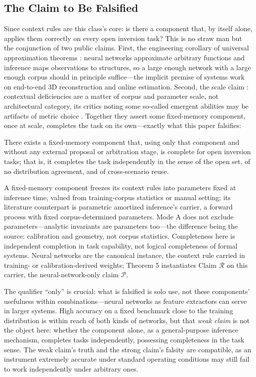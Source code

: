 \subsection{The Claim to Be Falsified}

Since context rules are this class's core: is there a component that, by itself alone, applies them correctly on every open inversion task? This is no straw man but the conjunction of two public claims. First, the engineering corollary of universal approximation theorems \citep{cybenko1989,hornik1989}: neural networks approximate arbitrary functions and inference maps observations to structures, so a large enough network with a large enough corpus should in principle suffice---the implicit premise of systems work on end-to-end 3D reconstruction and online estimation. Second, the scale claim \citep{bubeck2023}: contextual deficiencies are a matter of corpus and parameter scale, not architectural category, its critics noting some so-called emergent abilities may be artifacts of metric choice \citep{schaeffer2023}. Together they assert some fixed-memory component, once at scale, completes the task on its own---exactly what this paper falsifies:

\begin{claim}[$\mathcal{R}$]
There exists a fixed-memory component that, using only that component and without any external proposal or arbitration stage, is complete for open inversion tasks; that is, it completes the task independently in the sense of the open set, of no distribution agreement, and of cross-scenario reuse.
\end{claim}

A fixed-memory component freezes its context rules into parameters fixed at inference time, valued from training-corpus statistics or manual setting; its literature counterpart is parametric amortized inference's carrier, a forward process with fixed corpus-determined parameters. Mode A does not exclude parameters---analytic invariants are parameters too---the difference being the source: calibration and geometry, not corpus statistics. Completeness here is independent completion in task capability, not logical completeness of formal systems. Neural networks are the canonical instance, the context rule carried in training- or calibration-derived weights; Theorem 5 instantiates Claim $\mathcal{R}$ on this carrier, the neural-network-only claim $\mathcal{P}$.

The qualifier ``only'' is crucial: what is falsified is solo use, not these components' usefulness within combinations---neural networks as feature extractors can serve in larger systems. High accuracy on a fixed benchmark close to the training distribution is within reach of both kinds of networks, but that \emph{weak claim} is not the object here: whether the component alone, as a general-purpose inference mechanism, completes tasks independently, possessing completeness in the task sense. The weak claim's truth and the strong claim's falsity are compatible, as an instrument extremely accurate under standard operating conditions may still fail to work independently under arbitrary ones.

